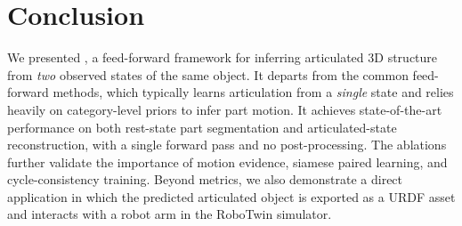 \section{Conclusion}%
\label{sec:conclusions}

We presented \method, a feed-forward framework for inferring articulated 3D structure from \emph{two} observed states of the same object.
It departs from the common feed-forward methods,
which typically learns articulation from a \emph{single} state and relies heavily on category-level priors to infer part motion.
It achieves state-of-the-art performance on both rest-state part segmentation and articulated-state reconstruction, with a single forward pass and no post-processing.
The ablations further validate the importance of motion evidence, siamese paired learning, and cycle-consistency training.
Beyond metrics, we also demonstrate a direct application in which the predicted articulated object is exported as a URDF asset and interacts with a robot arm in the RoboTwin simulator.



